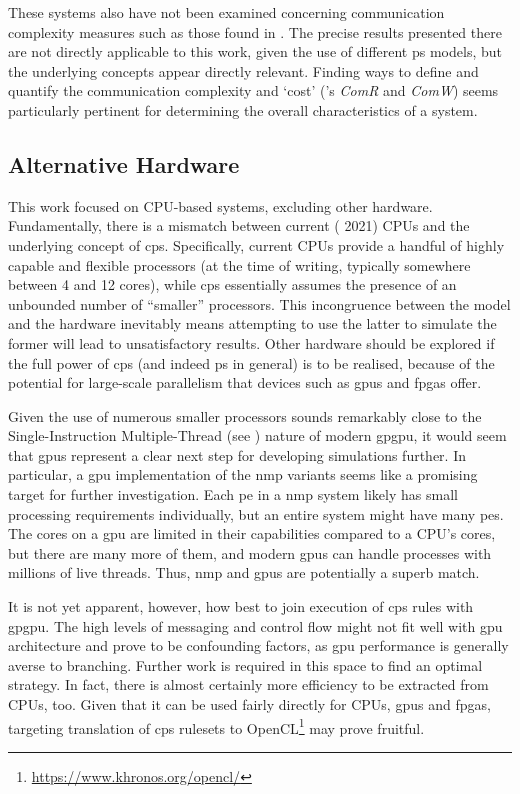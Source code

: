 These systems also have not been examined concerning communication complexity measures such as those found in \cite{Juayong2020}.  The precise results presented there are not directly applicable to this work, given the use of different \gls{ps} models, but the underlying concepts appear directly relevant.  Finding ways to define and quantify the communication complexity and `cost' (\cite{Juayong2020}'s \emph{ComR} and \emph{ComW}) seems particularly pertinent for determining the overall characteristics of a system.


\subsection{Alternative Hardware}
This work focused on CPU-based systems, excluding other hardware.  Fundamentally, there is a mismatch between current (\circa{} 2021) CPUs and the underlying concept of \gls{cps}.  Specifically, current CPUs provide a handful of highly capable and flexible processors (at the time of writing, typically somewhere between 4 and 12 cores), while \gls{cps} essentially assumes the presence of an unbounded number of ``smaller'' processors.  This incongruence between the model and the hardware inevitably means attempting to use the latter to simulate the former will lead to unsatisfactory results.  Other hardware should be explored if the full power of \gls{cps} (and indeed \gls{ps} in general) is to be realised, because of the potential for large-scale parallelism that devices such as \glspl{gpu} and \glspl{fpga} offer.

Given the use of numerous smaller processors sounds remarkably close to the Single-Instruction Multiple-Thread (see \cite[Ch. 4.4.1]{Hennessy2012}) nature of modern \gls{gpgpu}, it would seem that \glspl{gpu} represent a clear next step for developing simulations further.  In particular, a \gls{gpu} implementation of the \gls{nmp} variants seems like a promising target for further investigation.  Each \gls{pe} in a \gls{nmp} system likely has small processing requirements individually, but an entire system might have many \glspl{pe}.  The cores on a \gls{gpu} are limited in their capabilities compared to a CPU's cores, but there are many more of them, and modern \glspl{gpu} can handle processes with millions of live threads.  Thus, \gls{nmp} and \glspl{gpu} are potentially a superb match.

It is not yet apparent, however, how best to join execution of \gls{cps} rules with \gls{gpgpu}.  The high levels of messaging and control flow might not fit well with \gls{gpu} architecture and prove to be confounding factors, as \gls{gpu} performance is generally averse to branching.  Further work is required in this space to find an optimal strategy.  In fact, there is almost certainly more efficiency to be extracted from CPUs, too.  Given that it can be used fairly directly for CPUs, \glspl{gpu} and \glspl{fpga}, targeting translation of \gls{cps} \glspl{ruleset} to OpenCL\footnote{\url{https://www.khronos.org/opencl/}} may prove fruitful.

